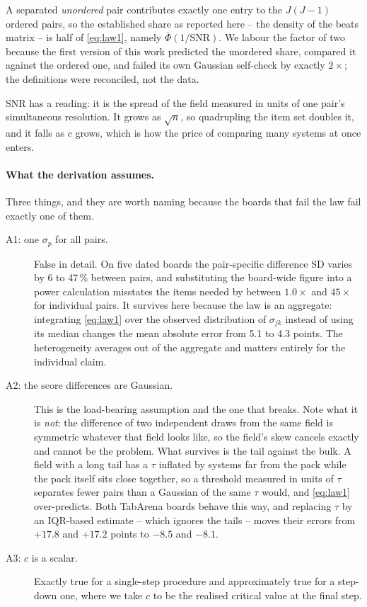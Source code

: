 \documentclass[10pt]{article}
\begin{document}
A separated \emph{unordered} pair contributes exactly one entry to the
$J(J-1)$ ordered pairs, so the established share as reported here -- the
density of the beats matrix -- is half of \eqref{eq:law1}, namely
$\bar\Phi(1/\mathrm{SNR})$. We labour the factor of two because the first
version of this work predicted the unordered share, compared it against the
ordered one, and failed its own Gaussian self-check by exactly $2\times$;
the definitions were reconciled, not the data.

$\mathrm{SNR}$ has a reading: it is the spread of the field measured in
units of one pair's simultaneous resolution. It grows as $\sqrt{n}$, so
quadrupling the item set doubles it, and it falls as $c$ grows, which is
how the price of comparing many systems at once enters.

\paragraph{What the derivation assumes.} Three things, and they are worth
naming because the boards that fail the law fail exactly one of them.

\begin{description}
\item[A1: one $\sigma_p$ for all pairs.] False in detail. On five dated
  boards the pair-specific difference SD varies by 6 to 47\,\% between pairs,
  and substituting the board-wide figure into a power calculation misstates
  the items needed by between $1.0\times$ and $45\times$ for individual
  pairs. It survives here because the law is an aggregate: integrating
  \eqref{eq:law1} over the observed distribution of $\sigma_{jk}$ instead of
  using its median changes the mean absolute error from 5.1 to 4.3 points.
  The heterogeneity averages out of the aggregate and matters entirely for
  the individual claim.
\item[A2: the score differences are Gaussian.] This is the load-bearing
  assumption and the one that breaks. Note what it is \emph{not}: the
  difference of two independent draws from the same field is symmetric
  whatever that field looks like, so the field's skew cancels exactly and
  cannot be the problem. What survives is the tail against the bulk. A
  field with a long tail has a $\tau$ inflated by systems far from the
  pack while the pack itself sits close together, so a threshold measured
  in units of $\tau$ separates fewer pairs than a Gaussian of the same
  $\tau$ would, and \eqref{eq:law1} over-predicts. Both TabArena boards
  behave this way, and replacing $\tau$ by an IQR-based estimate -- which
  ignores the tails -- moves their errors from $+17.8$ and $+17.2$ points
  to $-8.5$ and $-8.1$.
\item[A3: $c$ is a scalar.] Exactly true for a single-step procedure and
  approximately true for a step-down one, where we take $c$ to be the
  realised critical value at the final step.
\end{description}
\end{document}
